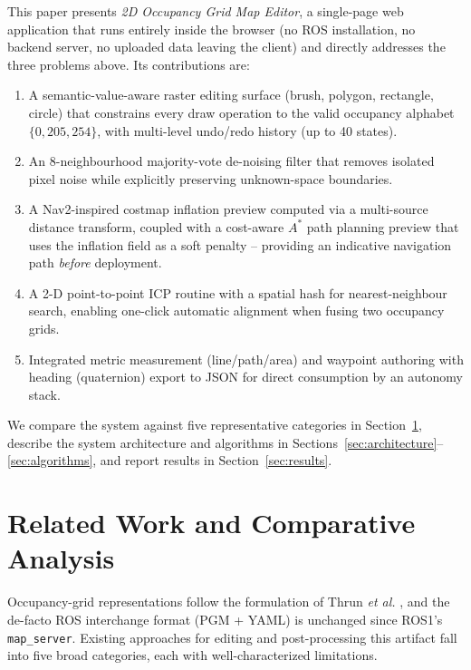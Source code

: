 \documentclass[journal]{IEEEtran}
\begin{document}
This paper presents \emph{2D Occupancy Grid Map Editor}, a single-page web application that runs entirely inside the browser (no ROS installation, no backend server, no uploaded data leaving the client) and directly addresses the three problems above. Its contributions are:
\begin{enumerate}
  \setlength{\itemsep}{0pt}
  \setlength{\parskip}{0pt}
  \item A semantic-value-aware raster editing surface (brush, polygon, rectangle, circle) that constrains every draw operation to the valid occupancy alphabet $\{0,205,254\}$, with multi-level undo/redo history (up to 40 states).
  \item An 8-neighbourhood majority-vote de-noising filter that removes isolated pixel noise while explicitly preserving unknown-space boundaries.
  \item A Nav2-inspired costmap inflation preview computed via a multi-source distance transform, coupled with a cost-aware $A^{*}$ path planning preview that uses the inflation field as a soft penalty -- providing an indicative navigation path \emph{before} deployment.
  \item A 2-D point-to-point ICP routine with a spatial hash for nearest-neighbour search, enabling one-click automatic alignment when fusing two occupancy grids.
  \item Integrated metric measurement (line/path/area) and waypoint authoring with heading (quaternion) export to JSON for direct consumption by an autonomy stack.
\end{enumerate}
We compare the system against five representative categories in Section~\ref{sec:related}, describe the system architecture and algorithms in Sections~\ref{sec:architecture}--\ref{sec:algorithms}, and report results in Section~\ref{sec:results}.

\section{Related Work and Comparative Analysis}
\label{sec:related}
Occupancy-grid representations follow the formulation of Thrun \emph{et al.} \cite{thrun2005probabilistic}, and the de-facto ROS interchange format (PGM + YAML) is unchanged since ROS1's \texttt{map\_server}. Existing approaches for editing and post-processing this artifact fall into five broad categories, each with well-characterized limitations.
\end{document}
